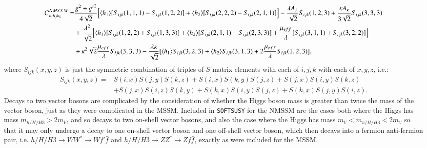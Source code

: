 \documentclass[final,3p,times,pdflatex]{elsarticle}
\begin{document}
\begin{equation}
\begin{aligned}
\mathcal{C}_{h_{i}h_{j}h_{k}}^{NMSSM} = & {g^2 + {g'}^2 \over 4\sqrt{2}}\Big[ \langle h_1 \rangle [S_{ijk}(1,1,1) - S_{ijk}(1,2,2)] + \langle h_2 \rangle [S_{ijk}(2,2,2) - S_{ijk}(2,1,1)]\Big] - {\lambda A_{\lambda} \over \sqrt{2}} S_{ijk}(1,2,3) + {\kappa A_{\kappa} \over 3 \sqrt{2}}S_{ijk}(3,3,3) \\ & + {\lambda^2 \over \sqrt{2}}\Big[ \langle h_1 \rangle [S_{ijk}(1,2,2) + S_{ijk}(1,3,3)] + \langle h_2 \rangle [S_{ijk}(2,1,1) + S_{ijk}(2,3,3)] + {\mu_{eff} \over \lambda}[S_{ijk}(3,1,1)+S_{ijk}(3,2,2)]\Big]\\ & + \kappa^2 \sqrt{2} {\mu_{eff} \over \lambda} S_{ijk}(3,3,3) - {\lambda \kappa \over \sqrt{2}}[\langle h_1 \rangle S_{ijk}(3,2,3) + \langle h_2 \rangle S_{ijk}(3,1,3) + 2{\mu_{eff} \over \lambda}S_{ijk}(1,2,3)],
\end{aligned}
\end{equation}
where $S_{ijk}(x,y,z)$ is just the symmetric combination of triples of $S$ matrix elements with each of $i,j,k$ with each of $x,y,z$, i.e.:
\begin{equation}
\begin{aligned}
S_{ijk}(x,y,z) = & S(i,x)S(j,y)S(k,z) + S(i,x)S(k,y)S(j,z) + S(j,x)S(i,y)S(k,z) \\ & + S(j,x)S(i,z)S(k,y) + S(k,x)S(i,y)S(j,z) + S(k,x)S(j,y)S(i,z).
\end{aligned}
\end{equation}
Decays to two vector bosons are complicated by the consideration of whether the Higgs boson mass is greater than twice the mass of the vector boson, just as they were complicated in the MSSM\@. Included in {\tt SOFTSUSY} for the NMSSM are the cases both where the Higgs has mass $m_{h/H/H3} > 2m_V $, and so decays to two on-shell vector bosons, and also the case where the Higgs has mass $m_V < m_{h/H/H3} < 2m_V$ so that it may only undergo a decay to one on-shell vector boson and one off-shell vector boson, which then decays into a fermion anti-fermion pair, i.e. $h/H/H3 \rightarrow WW^* \rightarrow Wf'\bar{f}$ and $h/H/H3 \rightarrow ZZ^* \rightarrow Zf\bar{f}$, exactly as were included for the MSSM\@.
\end{document}
